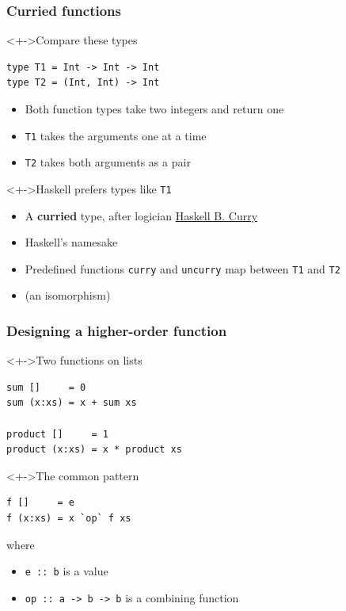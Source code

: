 \documentclass{beamer}
\begin{document}
\begin{frame}[fragile]
  \frametitle{Curried functions}

\begin{block}<+->{Compare these types}
\begin{verbatim}
type T1 = Int -> Int -> Int
type T2 = (Int, Int) -> Int
\end{verbatim}
\begin{itemize}
\item Both function types take two integers and return one
\item \texttt{T1} takes the arguments one at a time
\item \texttt{T2} takes both arguments as a pair
\end{itemize}
\end{block}
\begin{block}<+->{Haskell prefers types like \texttt{T1}}
  \begin{itemize}
  \item A \textbf{curried} type, after logician \href{https://en.wikipedia.org/wiki/Haskell_Curry}{Haskell B. Curry}
  \item Haskell's namesake
  \item Predefined functions \texttt{curry} and \texttt{uncurry} map between \texttt{T1} and \texttt{T2}
  \item (an isomorphism)
  \end{itemize}
\end{block}
\end{frame}
\begin{frame}[fragile]
  \frametitle{Designing a higher-order function}
  \onslide<+->{}
  \begin{block}<+->{Two functions on lists}
\begin{verbatim}
sum []     = 0
sum (x:xs) = x + sum xs

product []     = 1
product (x:xs) = x * product xs
\end{verbatim}
  \end{block}
  \begin{block}<+->{The common pattern}
\begin{verbatim}
f []     = e
f (x:xs) = x `op` f xs
\end{verbatim}
    where
    \begin{itemize}
    \item \texttt{e :: b} is a value
    \item \texttt{op :: a -> b -> b} is a combining function
    \end{itemize}
  \end{block}
\end{frame}
\end{document}
